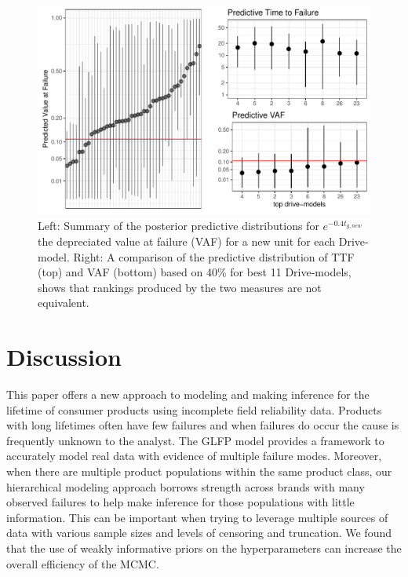 \documentclass[12pt]{article}
\begin{document}
 
 

\begin{figure}[H]
  \centering
  \includegraphics[width=.8\textwidth]{dm-eval}
  \caption{Left: Summary of the posterior predictive distributions for $e^{-0.4 t_{g,new}}$ the depreciated value at failure (VAF) for a new unit for each Drive-model.
  Right: A comparison of the predictive distribution of TTF (top) and VAF (bottom) based on 40\% for best 11 Drive-models, shows that rankings produced by the two measures are not equivalent.}
  \label{fig5}
\end{figure}


\section{Discussion}
\label{sec:Discussion}
This paper offers a new approach to modeling and making inference for the lifetime of consumer products using incomplete field reliability data.  Products with long lifetimes often have few failures and when failures do occur the cause is frequently unknown to the analyst.  The GLFP model provides a framework to accurately model real data with evidence of multiple failure modes. Moreover, when there are multiple product populations within the same product class, our hierarchical modeling approach borrows strength across brands with many observed failures to help make inference for those populations with little information.  This can be important when trying to leverage multiple sources of data with various sample sizes and levels of censoring and truncation.  We found that the use of weakly informative priors on the hyperparameters can increase the overall efficiency of the MCMC. %
  
\end{document}
